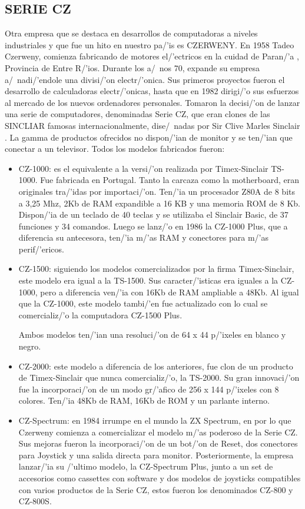 \documentclass[%
 	final,
%
	notitlepage,
	narroweqnarray,
	inline,
 	twoside,
	]{ieee}
\begin{document}
\subsection*{SERIE CZ}

Otra empresa que se destaca en desarrollos de computadoras a niveles industriales y que fue un hito en nuestro pa/'is es CZERWENY. En 1958 Tadeo Czerweny, comienza fabricando de motores el/'ectricos en la cuidad de Paran/'a , Provincia de Entre R/'ios. Durante los a/~nos 70, expande su empresa a/~nadi/'endole una divisi/'on electr/'onica. Sus primeros proyectos fueron el desarrollo de calculadoras electr/'onicas, hasta que en 1982 dirigi/'o sus esfuerzos al mercado de los nuevos ordenadores personales. Tomaron la decisi/'on de lanzar una serie de computadores, denominadas Serie CZ, que eran clones de las SINCLIAR famosas internacionalmente, dise/~nadas por Sir Clive Marles Sinclair \cite{cinclair}.
La gamma de productos ofrecidos no dispon/'ian de monitor y se ten/'ian que conectar a un televisor. Todos los modelos fabricados fueron:
\begin{itemize}

\item CZ-1000: es el equivalente a la versi/'on realizada por Timex-Sinclair TS-1000. Fue fabricada en Portugal. Tanto la carcaza como la motherboard, eran originales tra/'idas por importaci/'on. Ten/'ia un procesador Z80A de 8 bits a 3,25 Mhz, 2Kb de RAM expandible a 16 KB y una memoria ROM de 8 Kb. Dispon/'ia de un teclado de 40 teclas y se utilizaba el Sinclair Basic, de 37 funciones y 34 comandos.
Luego se lanz/'o en 1986 la CZ-1000 Plus, que a diferencia su antecesora, ten/'ia m/'as RAM y conectores para m/'as perif/'ericos.

\item CZ-1500: siguiendo los modelos comercializados por la firma Timex-Sinclair, este modelo era igual a la TS-1500. Sus caracter/'isticas era iguales a la CZ-1000, pero a diferencia ven/'ia con 16Kb de RAM ampliable a 48Kb.
Al igual que la CZ-1000, este modelo tambi/'en fue actualizado con lo cual se comercializ/'o la computadora CZ-1500 Plus.

Ambos modelos ten/'ian una resoluci/'on de 64 x 44 p/'ixeles en blanco y negro.

\item CZ-2000: este modelo a diferencia de los anteriores, fue clon de un producto de Timex-Sinclair que nunca comercializ/'o, la TS-2000. Su gran innovaci/'on fue la incorporaci/'on de un modo gr/'afico de 256 x 144 p/'ixeles con 8 colores. Ten/'ia 48Kb de RAM, 16Kb de ROM y un parlante interno.

\item CZ-Spectrum: en 1984 irrumpe en el mundo la ZX Spectrum, en por lo que Czerweny comienza a comercializar el modelo m/'as poderoso de la Serie CZ. Sus mejoras fueron la incorporaci/'on de un bot/'on de Reset, dos conectores para Joystick y una salida directa para monitor.
Posteriormente, la empresa lanzar/'ia su /'ultimo modelo, la CZ-Spectrum Plus, junto a un set de accesorios como cassettes con software y dos modelos de joysticks compatibles con varios productos de la Serie CZ, estos fueron los denominados CZ-800 y CZ-800S.

\end{itemize}
\end{document}
